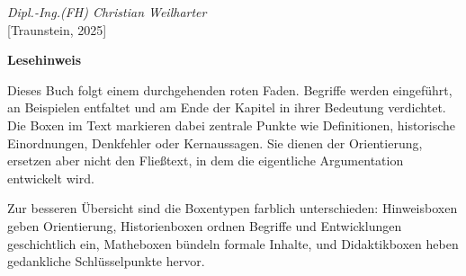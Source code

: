 \begin{flushright}
	\textit{Dipl.-Ing.(FH) Christian Weilharter} \\
	\vspace{0.5em}
	[Traunstein, 2025]
\end{flushright}

\newpage
\noindent
\bigskip
\noindent
\textbf{Lesehinweis}

Dieses Buch folgt einem durchgehenden roten Faden.
Begriffe werden eingeführt,
an Beispielen entfaltet
und am Ende der Kapitel in ihrer Bedeutung verdichtet.
Die Boxen im Text markieren dabei zentrale Punkte
wie Definitionen, historische Einordnungen, Denkfehler oder Kernaussagen.
Sie dienen der Orientierung,
ersetzen aber nicht den Fließtext,
in dem die eigentliche Argumentation entwickelt wird.

\medskip
\noindent
Zur besseren Übersicht sind die Boxentypen farblich unterschieden:
Hinweisboxen geben Orientierung,
Historienboxen ordnen Begriffe und Entwicklungen geschichtlich ein,
Matheboxen bündeln formale Inhalte,
und Didaktikboxen heben gedankliche Schlüsselpunkte hervor.
